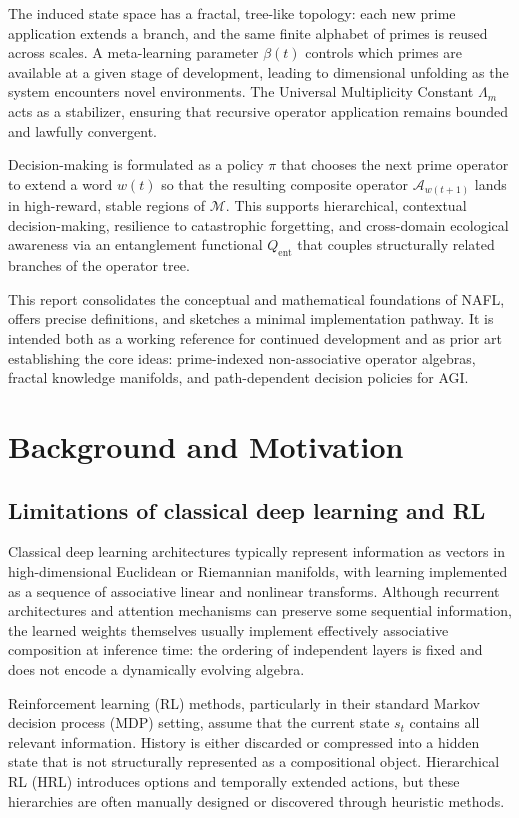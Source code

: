 \documentclass[11pt]{article}
\newcommand{\Mcal}{\mathcal{M}}
\newcommand{\Acal}{\mathcal{A}}
\newcommand{\Lm}{\Lambda_m}
\newcommand{\Awp}{\Acal_{w(t+1)}}
\begin{document}
The induced state space has a fractal, tree-like topology: each new prime application extends a branch, and the same finite alphabet of primes is reused across scales.
A meta-learning parameter \(\beta(t)\) controls which primes are available at a given stage of development, leading to dimensional unfolding as the system encounters novel environments.
The Universal Multiplicity Constant \(\Lm\) acts as a stabilizer, ensuring that recursive operator application remains bounded and lawfully convergent.

Decision-making is formulated as a policy \(\pi\) that chooses the next prime operator to extend a word \(w(t)\) so that the resulting composite operator \(\Awp\) lands in high-reward, stable regions of \(\Mcal\).
This supports hierarchical, contextual decision-making, resilience to catastrophic forgetting, and cross-domain ecological awareness via an entanglement functional \(Q_{\mathrm{ent}}\) that couples structurally related branches of the operator tree.

This report consolidates the conceptual and mathematical foundations of NAFL, offers precise definitions, and sketches a minimal implementation pathway.
It is intended both as a working reference for continued development and as prior art establishing the core ideas: prime-indexed non-associative operator algebras, fractal knowledge manifolds, and path-dependent decision policies for AGI.

\section{Background and Motivation}

\subsection{Limitations of classical deep learning and RL}

Classical deep learning architectures typically represent information as vectors in high-dimensional Euclidean or Riemannian manifolds, with learning implemented as a sequence of associative linear and nonlinear transforms.
Although recurrent architectures and attention mechanisms can preserve some sequential information, the learned weights themselves usually implement effectively associative composition at inference time: the ordering of independent layers is fixed and does not encode a dynamically evolving algebra.

Reinforcement learning (RL) methods, particularly in their standard Markov decision process (MDP) setting, assume that the current state \(s_t\) contains all relevant information.
History is either discarded or compressed into a hidden state that is not structurally represented as a compositional object.
Hierarchical RL (HRL) introduces options and temporally extended actions, but these hierarchies are often manually designed or discovered through heuristic methods.
\end{document}
